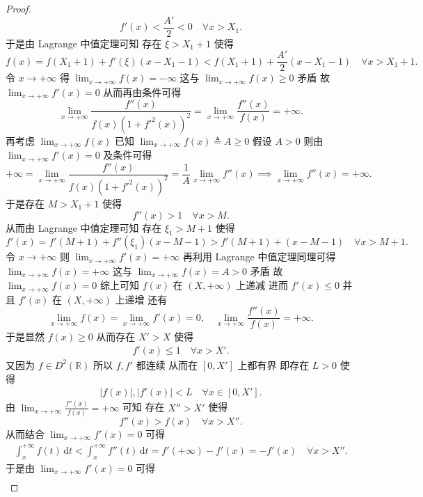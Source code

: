 \documentclass[../../main.tex]{subfiles}%
\begin{document}
\begin{proof}
\[
f'(x) < \frac{A'}{2} < 0 \quad \forall x > X_1.
\]
于是由 Lagrange 中值定理可知 存在 \( \xi > X_1 + 1 \) 使得
\[
f(x) = f(X_1 + 1) + f'(\xi)(x - X_1 - 1) < f(X_1 + 1) + \frac{A'}{2}(x - X_1 - 1) \quad \forall x > X_1 + 1.
\]
令 \( x \to +\infty \) 得 \( \lim_{x \to +\infty} f(x) = -\infty \) 这与 \( \lim_{x \to +\infty} f(x) \geqslant 0 \) 矛盾 故 \( \lim_{x \to +\infty} f'(x) = 0 \) 从而再由条件可得
\[
\lim_{x \to +\infty} \frac{f''(x)}{f(x)(1 + f'^2(x))^2} = \lim_{x \to +\infty} \frac{f''(x)}{f(x)} = +\infty.
\]
再考虑 \( \lim_{x \to +\infty} f(x) \) 已知 \( \lim_{x \to +\infty} f(x) \triangleq A \geqslant 0 \) 假设 \( A > 0 \) 则由 \( \lim_{x \to +\infty} f'(x) = 0 \) 及条件可得
\[
+\infty = \lim_{x \to +\infty} \frac{f''(x)}{f(x)(1 + f'^2(x))^2} = \frac{1}{A} \lim_{x \to +\infty} f''(x) \implies \lim_{x \to +\infty} f''(x) = +\infty.
\]
于是存在 \( M > X_1 + 1 \) 使得
\[
f''(x) > 1 \quad \forall x > M.
\]
从而由 Lagrange 中值定理可知 存在 \( \xi_1 > M + 1 \) 使得
\[
f'(x) = f'(M + 1) + f''(\xi_1)(x - M - 1) > f'(M + 1) + (x - M - 1) \quad \forall x > M + 1.
\]
令 \( x \to +\infty \) 则 \( \lim_{x \to +\infty} f'(x) = +\infty \) 再利用 Lagrange 中值定理同理可得 \( \lim_{x \to +\infty} f(x) = +\infty \) 这与 \( \lim_{x \to +\infty} f(x) = A > 0 \) 矛盾 故 \( \lim_{x \to +\infty} f(x) = 0 \) 综上可知 \( f(x) \) 在 \( (X, +\infty) \) 上递减 进而 \( f'(x) \leqslant 0 \) 并且 \( f'(x) \) 在 \( (X, +\infty) \) 上递增 还有
\[
\lim_{x \to +\infty} f(x) = \lim_{x \to +\infty} f'(x) = 0, \quad \lim_{x \to +\infty} \frac{f''(x)}{f(x)} = +\infty.
\]
于是显然 \( f(x) \geqslant 0 \) 从而存在 \( X' > X \) 使得
\begin{align}
f'(x) \leqslant 1 \quad \forall x > X' \label{100.21}.
\end{align}
又因为 \( f \in D^2(\mathbb{R}) \) 所以 \( f, f' \) 都连续 从而在 \( [0, X'] \) 上都有界 即存在 \( L > 0 \) 使得
\begin{align}
|f(x)|, |f'(x)| < L \quad \forall x \in [0, X'] \label{100.20}.
\end{align}
由 \( \lim_{x \to +\infty} \frac{f''(x)}{f(x)} = +\infty \) 可知 存在 \( X'' > X' \) 使得
\[
f''(x) > f(x) \quad \forall x > X''.
\]
从而结合 \( \lim_{x \to +\infty} f'(x) = 0 \) 可得
\begin{align}
\int_x^{+\infty} f(t) \, \mathrm{d}t < \int_x^{+\infty} f''(t) \, \mathrm{d}t = f'(+\infty) - f'(x) = -f'(x) \quad \forall x > X'' \label{100.18}.
\end{align}
于是由 \( \lim_{x \to +\infty} f'(x) = 0 \) 可得
\begin{align}

\end{align}
\end{proof}
\end{document}
